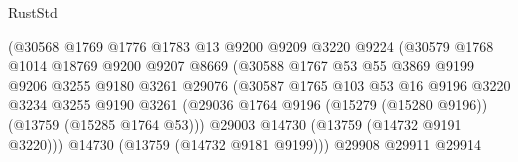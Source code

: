 \begin{lexlean}{RustStd}
\begin{coremodule}
                                      (@30568
                                        @1769
                                        @1776
                                        @1783
                                        @13
                                        @9200
                                        @9209
                                        @3220
                                        @9224
                                        (@30579
                                          @1768
                                          @1014
                                          @18769
                                          @9200
                                          @9207
                                          @8669
                                          (@30588
                                            @1767
                                            @53
                                            @55
                                            @3869
                                            @9199
                                            @9206
                                            @3255
                                            @9180
                                            @3261
                                            @29076
                                            (@30587
                                              @1765
                                              @103
                                              @53
                                              @16
                                              @9196
                                              @3220
                                              @3234
                                              @3255
                                              @9190
                                              @3261
                                              (@29036
                                                @1764
                                                @9196
                                                (@15279 (@15280 @9196))
                                                (@13759 (@15285 @1764 @53)))
                                              @29003
                                              @14730
                                              (@13759 (@14732 @9191 @3220)))
                                            @14730
                                            (@13759 (@14732 @9181 @9199)))
                                          @29908
                                          @29911
                                          @29914

\end{coremodule}
\end{lexlean}
